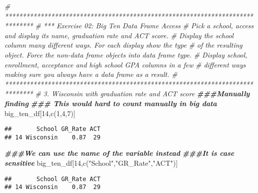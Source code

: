 \documentclass[
]{article}
\newenvironment{Shaded}{\begin{snugshade}}{\end{snugshade}}
\newcommand{\CommentTok}[1]{\textcolor[rgb]{0.56,0.35,0.01}{\textit{#1}}}
\newcommand{\DecValTok}[1]{\textcolor[rgb]{0.00,0.00,0.81}{#1}}
\newcommand{\DocumentationTok}[1]{\textcolor[rgb]{0.56,0.35,0.01}{\textbf{\textit{#1}}}}
\newcommand{\FunctionTok}[1]{\textcolor[rgb]{0.00,0.00,0.00}{#1}}
\newcommand{\NormalTok}[1]{#1}
\newcommand{\SpecialCharTok}[1]{\textcolor[rgb]{0.00,0.00,0.00}{#1}}
\newcommand{\StringTok}[1]{\textcolor[rgb]{0.31,0.60,0.02}{#1}}
\begin{document}
\begin{Shaded}
\begin{Highlighting}[]
\CommentTok{\# ******************************************************************************}
\CommentTok{\# *** Exercise 02: Big Ten Data Frame Access}
\CommentTok{\# Pick a school, access and display its name, graduation rate and ACT score.}
\CommentTok{\# Display the school column many different ways. For each display show the type }
\CommentTok{\# of the resulting object. Force the non{-}data frame objects into data frame type.}
\CommentTok{\# Display school, enrollment, acceptance and high school GPA columns in a few}
\CommentTok{\# different ways making sure you always have a data frame as a result.}
\CommentTok{\# ******************************************************************************}
\CommentTok{\# 3. Wisconsin with graduation rate and ACT score}
\DocumentationTok{\#\#\#Manually finding}
\DocumentationTok{\#\#\# This would hard to count manually in big data }
\NormalTok{big\_ten\_df[}\DecValTok{14}\NormalTok{,}\FunctionTok{c}\NormalTok{(}\DecValTok{1}\NormalTok{,}\DecValTok{4}\NormalTok{,}\DecValTok{7}\NormalTok{)]}
\end{Highlighting}
\end{Shaded}

\begin{verbatim}
##       School GR_Rate ACT
## 14 Wisconsin    0.87  29
\end{verbatim}

\begin{Shaded}
\begin{Highlighting}[]
\DocumentationTok{\#\#\#We can use the name of the variable instead }
\DocumentationTok{\#\#\#It is case sensitive}
\NormalTok{big\_ten\_df[}\DecValTok{14}\NormalTok{,}\FunctionTok{c}\NormalTok{(}\StringTok{"School"}\NormalTok{,}\StringTok{"GR\_Rate"}\NormalTok{,}\StringTok{"ACT"}\NormalTok{)]}
\end{Highlighting}
\end{Shaded}

\begin{verbatim}
##       School GR_Rate ACT
## 14 Wisconsin    0.87  29
\end{verbatim}

\begin{Shaded}
\end{Shaded}
\end{document}
